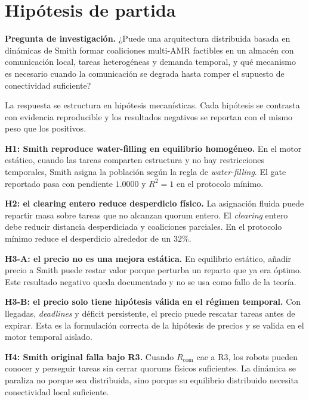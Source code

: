 \section{Hipótesis de partida}
\label{sec:hipotesis}

\textbf{Pregunta de investigación.}
¿Puede una arquitectura distribuida basada en dinámicas de Smith formar coaliciones
multi-AMR factibles en un almacén con comunicación local, tareas heterogéneas y demanda
temporal, y qué mecanismo es necesario cuando la comunicación se degrada hasta romper el
supuesto de conectividad suficiente?

La respuesta se estructura en hipótesis mecanísticas. Cada hipótesis se contrasta con
evidencia reproducible y los resultados negativos se reportan con el mismo peso que los
positivos.

\textbf{H1: Smith reproduce water-filling en equilibrio homogéneo.}
En el motor estático, cuando las tareas comparten estructura y no hay restricciones
temporales, Smith asigna la población según la regla de \emph{water-filling}. El gate
reportado pasa con pendiente $1.0000$ y $R^2=1$ en el protocolo mínimo.

\textbf{H2: el clearing entero reduce desperdicio físico.}
La asignación fluida puede repartir masa sobre tareas que no alcanzan quorum entero. El
\emph{clearing} entero debe reducir distancia desperdiciada y coaliciones parciales. En
el protocolo mínimo reduce el desperdicio alrededor de un $32\%$.

\textbf{H3-A: el precio no es una mejora estática.}
En equilibrio estático, añadir precio a Smith puede restar valor porque perturba un
reparto que ya era óptimo. Este resultado negativo queda documentado y no se usa como
fallo de la teoría.

\textbf{H3-B: el precio solo tiene hipótesis válida en el régimen temporal.}
Con llegadas, \emph{deadlines} y déficit persistente, el precio puede rescatar tareas
antes de expirar. Esta es la formulación correcta de la hipótesis de precios y se valida
en el motor temporal aislado.

\textbf{H4: Smith original falla bajo R3.}
Cuando $R_{\mathrm{com}}$ cae a R3, los robots pueden conocer y perseguir tareas sin
cerrar quorums físicos suficientes. La dinámica se paraliza no porque sea distribuida,
sino porque su equilibrio distribuido necesita conectividad local suficiente.

